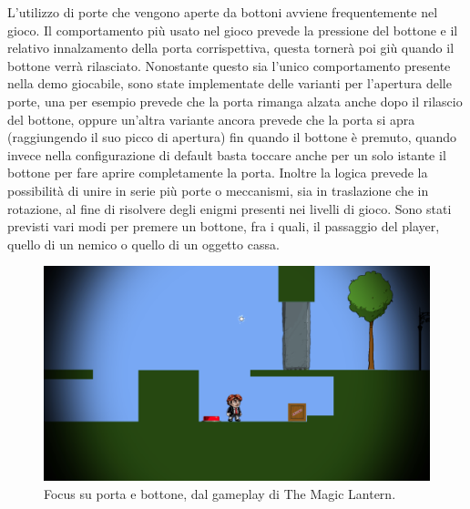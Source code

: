 L'utilizzo di porte che vengono aperte da bottoni avviene frequentemente nel gioco. Il comportamento più usato nel gioco prevede la pressione del bottone e il relativo innalzamento della porta corrispettiva, questa tornerà poi giù quando il bottone verrà rilasciato. Nonostante questo sia l'unico comportamento presente nella demo giocabile, sono state implementate delle varianti per l'apertura delle porte, una per esempio prevede che la porta rimanga alzata anche dopo il rilascio del bottone, oppure un'altra variante ancora prevede che la porta si apra (raggiungendo il suo picco di apertura) fin quando il bottone è premuto, quando invece nella configurazione di default basta toccare anche per un solo istante il bottone per fare aprire completamente la porta. Inoltre la logica prevede la possibilità di unire in serie più porte o meccanismi, sia in traslazione che in rotazione, al fine di risolvere degli enigmi presenti nei livelli di gioco. Sono stati previsti vari modi per premere un bottone, fra i quali, il passaggio del player, quello di un nemico o quello di un oggetto cassa.

\begin{figure}[h]
\centerline{\includegraphics[scale=0.35]{images/development/portaebottone.png}}
\caption{Focus su porta e bottone, dal gameplay di The Magic Lantern.}
\label{fig:portaebottone}
\end{figure}



